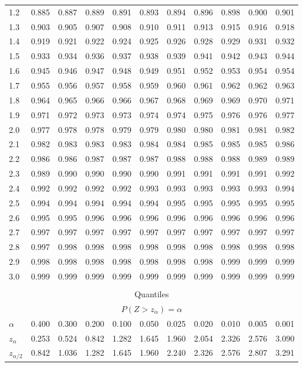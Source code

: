 \documentclass[1pt]{report}
\newcommand{\<}{\langle}
\renewcommand{\>}{\rangle}
\begin{document}
\begin{table}[H]
{{{\begin{tabular}{| l | l l l l l l l l l l|}
  1.2 & 0.885 & 0.887 & 0.889 & 0.891 & 0.893 & 0.894 & 0.896 & 0.898 & 0.900 & 0.901 \\ 
  1.3 & 0.903 & 0.905 & 0.907 & 0.908 & 0.910 & 0.911 & 0.913 & 0.915 & 0.916 & 0.918 \\ 
  1.4 & 0.919 & 0.921 & 0.922 & 0.924 & 0.925 & 0.926 & 0.928 & 0.929 & 0.931 & 0.932 \\ 
  1.5 & 0.933 & 0.934 & 0.936 & 0.937 & 0.938 & 0.939 & 0.941 & 0.942 & 0.943 & 0.944 \\ 
  1.6 & 0.945 & 0.946 & 0.947 & 0.948 & 0.949 & 0.951 & 0.952 & 0.953 & 0.954 & 0.954 \\ 
  1.7 & 0.955 & 0.956 & 0.957 & 0.958 & 0.959 & 0.960 & 0.961 & 0.962 & 0.962 & 0.963 \\ 
  1.8 & 0.964 & 0.965 & 0.966 & 0.966 & 0.967 & 0.968 & 0.969 & 0.969 & 0.970 & 0.971 \\ 
  1.9 & 0.971 & 0.972 & 0.973 & 0.973 & 0.974 & 0.974 & 0.975 & 0.976 & 0.976 & 0.977 \\ 
  2.0 & 0.977 & 0.978 & 0.978 & 0.979 & 0.979 & 0.980 & 0.980 & 0.981 & 0.981 &  0.982 \\ \hline \hline
  2.1 & 0.982 & 0.983 & 0.983 & 0.983 & 0.984 & 0.984 & 0.985 & 0.985 & 0.985 & 0.986 \\ 
  2.2 & 0.986 & 0.986 & 0.987 & 0.987 & 0.987 & 0.988 & 0.988 & 0.988 & 0.989 & 0.989 \\ 
  2.3 & 0.989 & 0.990 & 0.990 & 0.990 & 0.990 & 0.991 & 0.991 & 0.991 & 0.991 & 0.992 \\ 
  2.4 & 0.992 & 0.992 & 0.992 & 0.992 & 0.993 & 0.993 & 0.993 & 0.993 & 0.993 & 0.994 \\ 
  2.5 & 0.994 & 0.994 & 0.994 & 0.994 & 0.994 & 0.995 & 0.995 & 0.995 & 0.995 & 0.995 \\ 
  2.6 & 0.995 & 0.995 & 0.996 & 0.996 & 0.996 & 0.996 & 0.996 & 0.996 & 0.996 & 0.996 \\ 
  2.7 & 0.997 & 0.997 & 0.997 & 0.997 & 0.997 & 0.997 & 0.997 & 0.997 & 0.997 & 0.997 \\ 
  2.8 & 0.997 & 0.998 & 0.998 & 0.998 & 0.998 & 0.998 & 0.998 & 0.998 & 0.998 & 0.998 \\ 
  2.9 & 0.998 & 0.998 & 0.998 & 0.998 & 0.998 & 0.998 & 0.998 & 0.999 & 0.999 & 0.999 \\ 
  3.0 & 0.999 & 0.999 & 0.999 & 0.999 & 0.999 & 0.999 & 0.999 & 0.999 & 0.999 & 0.999 \\ \hline 
  \multicolumn{11}{c}{} \\ \hline
  \multicolumn{11}{|c|}{Quantiles} \\
  \multicolumn{11}{|c|}{$P(Z > z_\alpha) = \alpha$} \\
$\alpha$ & 0.400 & 0.300 & 0.200 & 0.100 & 0.050 & 0.025 & 0.020 & 0.010 & 0.005 & 0.001 \\ \hline
$z_\alpha$ & 0.253 & 0.524 & 0.842 & 1.282 & 1.645 & 1.960 & 2.054 & 2.326 & 2.576 & 3.090 \\
$z_{\alpha/2}$ & 0.842 & 1.036 & 1.282 & 1.645 & 1.960 & 2.240 & 2.326 & 2.576 & 2.807 & 3.291 \\ \hline
\end{tabular}}}}
\end{table}
\end{document}
